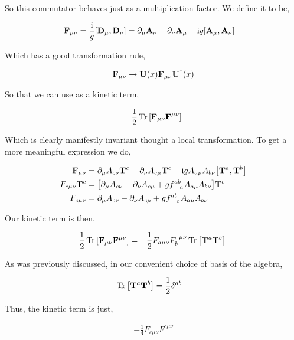 So this commutator behaves just as a multiplication factor. We define it to be,

\begin{align}
    \vb F_{\mu\nu}&=\frac{\im}{g}\comm{\vb D_\mu}{\vb D_\nu}=\partial_\mu\vb A_\nu-\partial_\nu\vb A_\mu-\im g\comm{\vb A_\mu}{\vb A_\nu}
\end{align}

Which has a good transformation rule,

\begin{align}
    \vb F_{\mu\nu}\rightarrow\vb U\qty(x)\vb F_{\mu\nu}\vb U^\dagger\qty(x)\nonumber
\end{align}

So that we can use as a kinetic term,

\begin{align}
    -\frac12\Tr\qty[\vb F_{\mu\nu}\vb F^{\mu\nu}]
\end{align}

Which is clearly manifestly invariant thought a local transformation. To get a more meaningful expression we do,

\begin{align}
    \vb F_{\mu\nu}&=\partial_\mu A_{c\nu}\vb T^c-\partial_\nu A_{c\mu}\vb T^c-\im g A_{a\mu}A_{b\nu}\comm{\vb T^{a}}{\vb T^b}\nonumber\\
    F_{c\mu\nu}\vb T^c&=\qty[\partial_\mu A_{c\nu}-\partial_\nu A_{c\mu}+g\tensor{f}{^a^b_c} A_{a\mu}A_{b\nu}]\vb T^c\nonumber\\
    F_{c\mu\nu}&=\partial_\mu A_{c\nu}-\partial_\nu A_{c\mu}+g\tensor{f}{^a^b_c} A_{a\mu}A_{b\nu}\nonumber
\end{align}

Our kinetic term is then,

\begin{align}
    -\frac12\Tr\qty[\vb F_{\mu\nu}\vb F^{\mu\nu}]&=-\frac12F_{a\mu\nu}\tensor{F}{_b^\mu^\nu}\Tr\qty[\vb T^a\vb T^b]\nonumber
\end{align}

As was previously discussed, in our convenient choice of basis of the algebra,

\begin{align}
    \Tr\qty[\vb T^a\vb T^b]&=\frac12\delta^{ab}\nonumber
\end{align}

Thus, the kinetic term is just,

\begin{align}
    -\frac14F_{c\mu\nu}F^{c\mu\nu}\nonumber
\end{align}

